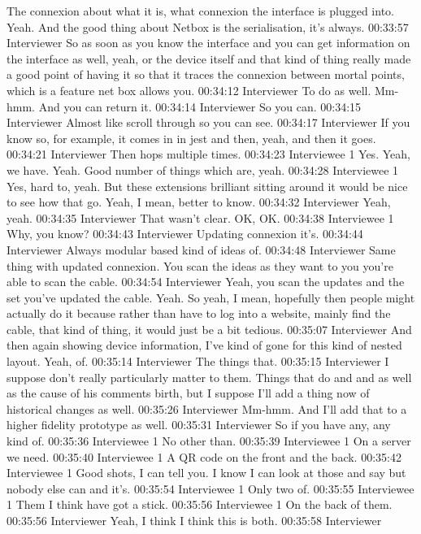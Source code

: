 The connexion about what it is, what connexion the interface is plugged into. Yeah. And the good thing about Netbox is the serialisation, it's always.
00:33:57 Interviewer
So as soon as you know the interface and you can get information on the interface as well, yeah, or the device itself and that kind of thing really made a good point of having it so that it traces the connexion between mortal points, which is a feature net box allows you.
00:34:12 Interviewer
To do as well. Mm-hmm. And you can return it.
00:34:14 Interviewer
So you can.
00:34:15 Interviewer
Almost like scroll through so you can see.
00:34:17 Interviewer
If you know so, for example, it comes in in jest and then, yeah, and then it goes.
00:34:21 Interviewer
Then hops multiple times.
00:34:23 Interviewee 1
Yes. Yeah, we have. Yeah. Good number of things which are, yeah.
00:34:28 Interviewee 1
Yes, hard to, yeah. But these extensions brilliant sitting around it would be nice to see how that go. Yeah, I mean, better to know.
00:34:32 Interviewer
Yeah, yeah.
00:34:35 Interviewer
That wasn't clear. OK, OK.
00:34:38 Interviewee 1
Why, you know?
00:34:43 Interviewer
Updating connexion it's.
00:34:44 Interviewer
Always modular based kind of ideas of.
00:34:48 Interviewer
Same thing with updated connexion. You scan the ideas as they want to you you're able to scan the cable.
00:34:54 Interviewer
Yeah, you scan the updates and the set you've updated the cable. Yeah. So yeah, I mean, hopefully then people might actually do it because rather than have to log into a website, mainly find the cable, that kind of thing, it would just be a bit tedious.
00:35:07 Interviewer
And then again showing device information, I've kind of gone for this kind of nested layout. Yeah, of.
00:35:14 Interviewer
The things that.
00:35:15 Interviewer
I suppose don't really particularly matter to them. Things that do and and as well as the cause of his comments birth, but I suppose I'll add a thing now of historical changes as well.
00:35:26 Interviewer
Mm-hmm. And I'll add that to a higher fidelity prototype as well.
00:35:31 Interviewer
So if you have any, any kind of.
00:35:36 Interviewee 1
No other than.
00:35:39 Interviewee 1
On a server we need.
00:35:40 Interviewee 1
A QR code on the front and the back.
00:35:42 Interviewee 1
Good shots, I can tell you. I know I can look at those and say but nobody else can and it's.
00:35:54 Interviewee 1
Only two of.
00:35:55 Interviewee 1
Them I think have got a stick.
00:35:56 Interviewee 1
On the back of them.
00:35:56 Interviewer
Yeah, I think I think this is both.
00:35:58 Interviewer
